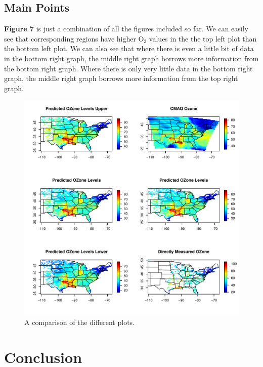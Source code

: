 \documentclass{article}                                                   %
\def\beginmyfig{\begin{figure}[htbp]\begin{center}}                       %
\def\endmyfig{\end{center}\end{figure}}                                   %
\begin{document}
    
  \subsection{Main Points}
    \textbf{Figure 7} is just a combination of all the figures included so far. 
    We can easily see that corresponding regions have higher O$_3$ values 
    in the the top left plot than the bottom left plot. We can also see that
    where there is even a little bit of data in the bottom right graph, the middle
    right graph borrows more information from the bottom right graph. Where there
    is only very little data in the bottom right graph, the middle right graph
    borrows more information from the top right graph.

    \beginmyfig  
      \includegraphics{raw/all.pdf}
      \caption{A comparison of the different plots.}
    \endmyfig

\section{Conclusion}
\end{document}
